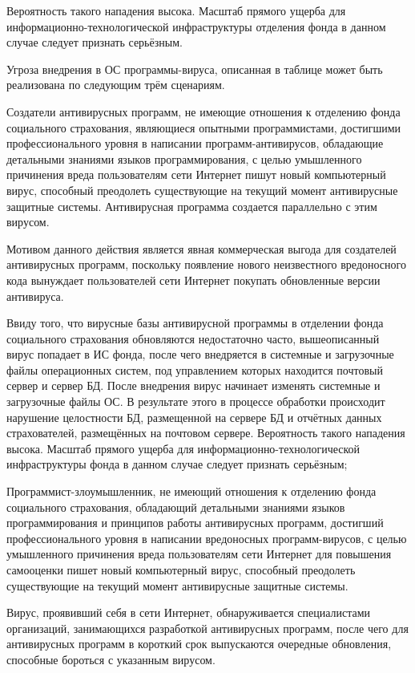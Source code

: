 Вероятность такого нападения высока. Масштаб прямого ущерба для
информационно-технологической инфраструктуры отделения фонда в данном
случае следует признать серьёзным.

\point Угроза внедрения в ОС программы-вируса, описанная в таблице
может быть реализована по следующим трём сценариям.

\point Создатели антивирусных программ, не имеющие отношения к
отделению фонда социального страхования, являющиеся опытными
программистами, достигшими профессионального уровня в написании
программ-антивирусов, обладающие детальными знаниями языков
программирования, с целью умышленного причинения вреда пользователям
сети Интернет пишут новый компьютерный вирус, способный преодолеть
существующие на текущий момент антивирусные защитные
системы. Антивирусная программа создается параллельно с этим вирусом.

Мотивом данного действия является явная коммерческая выгода для
создателей антивирусных программ, поскольку появление нового
неизвестного вредоносного кода вынуждает пользователей сети Интернет
покупать обновленные версии антивируса.

Ввиду того, что вирусные базы антивирусной программы в отделении фонда
социального страхования обновляются недостаточно часто, вышеописанный
вирус попадает в ИС фонда, после чего внедряется в системные и
загрузочные файлы операционных систем, под управлением которых
находится почтовый сервер и сервер БД. После внедрения вирус начинает
изменять системные и загрузочные файлы ОС. В результате этого в
процессе обработки происходит нарушение целостности БД, размещенной на
сервере БД и отчётных данных страхователей, размещённых на почтовом
сервере. Вероятность такого нападения высока. Масштаб прямого ущерба
для информационно-технологической инфраструктуры фонда в данном случае
следует признать серьёзным;

\point Программист-злоумышленник, не имеющий отношения к отделению фонда
социального страхования, обладающий детальными знаниями языков
программирования и принципов работы антивирусных программ, достигший
профессионального уровня в написании вредоносных программ-вирусов, с
целью умышленного причинения вреда пользователям сети Интернет для
повышения самооценки пишет новый компьютерный вирус, способный
преодолеть существующие на текущий момент антивирусные защитные
системы.

Вирус, проявивший себя в сети Интернет, обнаруживается специалистами
организаций, занимающихся разработкой антивирусных программ, после
чего для антивирусных программ в короткий срок выпускаются очередные
обновления, способные бороться с указанным вирусом.

